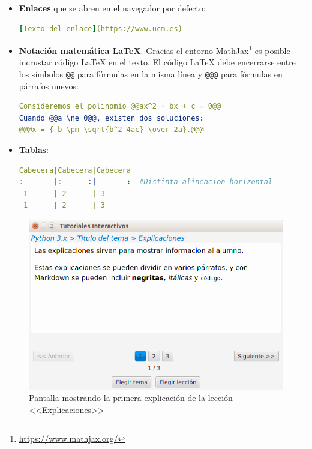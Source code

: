 \documentclass[]{article}
\newcommand{\code}[1]{{\lstinline[basicstyle=\ttfamily,mathescape]!#1!}}
\begin{document}
\begin{itemize}
\begin{lstlisting}[language=yaml,numbers=none]
**Imagen desde el directorio de temas, con ruta relativa**
![triangulo](file://img/triangulo.jpg)
\end{lstlisting}		
	Todas las imágenes cuya ruta comience con \code{file://} serán consideradas imágenes locales cuya ruta es relativa al directorio donde reside el tema actual. Por ejemplo, si el tema actual reside en <<\code{/opt/temas/Python 3.x}>>, la imagen <<\code{file://img/triangulo.jpg}>> se referirá al fichero situado en <<\code{/opt/temas/Python 3.x/img/triangulo.jpg}>>.
	\item \textbf{Enlaces} que se abren en el navegador por defecto:
\begin{lstlisting}[language=yaml,numbers=none]
[Texto del enlace](https://www.ucm.es)
\end{lstlisting}
	\item \textbf{Notación matemática \LaTeX}. Gracias el entorno MathJax\footnote{\url{https://www.mathjax.org/}} es posible incrustar código \LaTeX{} en el texto. El código \LaTeX{} debe encerrarse entre los símbolos \code{@@} para fórmulas en la misma línea y \code{@@@} para fórmulas en párrafos nuevos:
\begin{lstlisting}[language=yaml,numbers=none]
Consideremos el polinomio @@ax^2 + bx + c = 0@@
Cuando @@a \ne 0@@, existen dos soluciones:
@@@x = {-b \pm \sqrt{b^2-4ac} \over 2a}.@@@	
\end{lstlisting}
	\item \textbf{Tablas}:
\begin{lstlisting}[language=yaml,numbers=none]
Cabecera|Cabecera|Cabecera
:-------|:------:|-------:  #Distinta alineacion horizontal
 1      | 2      | 3
 1      | 2      | 3
\end{lstlisting}	
\end{itemize}

\begin{figure}[tb]
	\centerline{\includegraphics[scale=0.5]{explicacion}}
	\caption{Pantalla mostrando la primera explicación de la lección <<Explicaciones>>\label{fig:explicacion}}
\end{figure}
\end{document}
